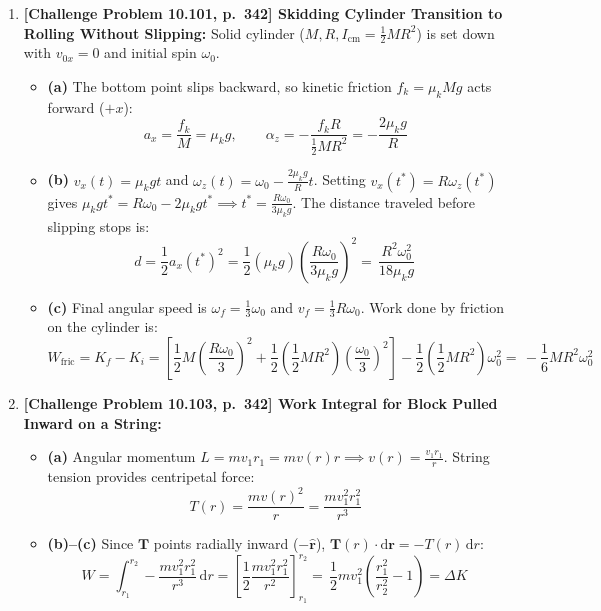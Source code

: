 \documentclass[11pt,a4paper,openany,oneside]{book}
\newcommand{\eqbox}[1]{\boxed{\,#1\,}}
\newcommand{\vect}[1]{\mathbf{#1}}
\newcommand{\uv}[1]{\hat{\mathbf{#1}}}
\newcommand{\dd}{\,\mathrm{d}}
\newcommand{\diff}{\mathrm{d}}
\numberwithin{equation}{chapter}
\begin{document}
\begin{enumerate}[label=\textbf{Prob.\ 10.\arabic*},leftmargin=4.5em]
  \item \textbf{[Challenge Problem 10.101, p.\ 342] Skidding Cylinder Transition to Rolling Without Slipping:}
  Solid cylinder ($M, R, I_{\text{cm}} = \frac{1}{2}MR^2$) is set down with $v_{0x} = 0$ and initial spin $\omega_0$.
  \begin{itemize}
    \item \textbf{(a)} The bottom point slips backward, so kinetic friction $f_k = \mu_k Mg$ acts forward ($+x$):
    \begin{equation*}
      \eqbox{a_x = \frac{f_k}{M} = \mu_k g, \qquad \alpha_z = -\frac{f_k R}{\frac{1}{2}MR^2} = -\frac{2\mu_k g}{R}}
    \end{equation*}
    \item \textbf{(b)} $v_x(t) = \mu_k gt$ and $\omega_z(t) = \omega_0 - \frac{2\mu_k g}{R}t$. Setting $v_x(t^*) = R\omega_z(t^*)$ gives $\mu_k gt^* = R\omega_0 - 2\mu_k gt^* \implies t^* = \frac{R\omega_0}{3\mu_k g}$. The distance traveled before slipping stops is:
    \begin{equation*}
      d = \frac{1}{2}a_x(t^*)^2 = \frac{1}{2}(\mu_k g)\!\left(\frac{R\omega_0}{3\mu_k g}\right)^2 = \eqbox{\frac{R^2\omega_0^2}{18\mu_k g}}
    \end{equation*}
    \item \textbf{(c)} Final angular speed is $\omega_f = \frac{1}{3}\omega_0$ and $v_f = \frac{1}{3}R\omega_0$. Work done by friction on the cylinder is:
    \begin{equation*}
      W_{\text{fric}} = K_f - K_i = \left[\frac{1}{2}M\!\left(\frac{R\omega_0}{3}\right)^2 + \frac{1}{2}\!\left(\frac{1}{2}MR^2\right)\!\left(\frac{\omega_0}{3}\right)^2\right] - \frac{1}{2}\!\left(\frac{1}{2}MR^2\right)\omega_0^2 = \eqbox{-\frac{1}{6}MR^2\omega_0^2}
    \end{equation*}
  \end{itemize}

  \setcounter{enumi}{102}
  \item \textbf{[Challenge Problem 10.103, p.\ 342] Work Integral for Block Pulled Inward on a String:}
  \begin{itemize}
    \item \textbf{(a)} Angular momentum $L = mv_1 r_1 = mv(r)r \implies v(r) = \frac{v_1 r_1}{r}$. String tension provides centripetal force:
    \begin{equation*}
      \eqbox{T(r) = \frac{mv(r)^2}{r} = \frac{mv_1^2 r_1^2}{r^3}}
    \end{equation*}
    \item \textbf{(b)--(c)} Since $\vect{T}$ points radially inward ($-\uv{r}$), $\vect{T}(r)\cdot\diff\vect{r} = -T(r)\dd r$:
    \begin{equation*}
      W = \int_{r_1}^{r_2} -\frac{mv_1^2 r_1^2}{r^3}\dd r = \left[\frac{1}{2}\frac{mv_1^2 r_1^2}{r^2}\right]_{r_1}^{r_2} = \eqbox{\frac{1}{2}mv_1^2\!\left(\frac{r_1^2}{r_2^2} - 1\right) = \Delta K}
    \end{equation*}
  \end{itemize}
\end{enumerate}
\end{document}
